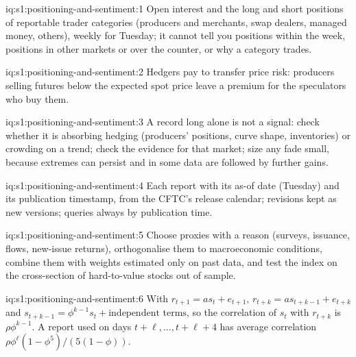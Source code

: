 \begin{solution}{iq:s1:positioning-and-sentiment:1}
Open interest and the long and short positions of reportable trader categories (producers and merchants, swap dealers, managed money, others), weekly
for Tuesday; it cannot tell you positions within the week, positions in other markets or over the counter, or why a category trades.
\end{solution}

\begin{solution}{iq:s1:positioning-and-sentiment:2}
Hedgers pay to transfer price risk: producers selling futures below the expected spot price leave a premium for the speculators who buy them.
\end{solution}

\begin{solution}{iq:s1:positioning-and-sentiment:3}
A record long alone is not a signal: check whether it is absorbing hedging (producers' positions, curve shape, inventories) or crowding on a trend;
check the evidence for that market; size any fade small, because extremes can persist and in some data are followed by further gains.
\end{solution}

\begin{solution}{iq:s1:positioning-and-sentiment:4}
Each report with its as-of date (Tuesday) and its publication timestamp, from the CFTC's release calendar; revisions kept as new versions; queries
always by publication time.
\end{solution}

\begin{solution}{iq:s1:positioning-and-sentiment:5}
Choose proxies with a reason (surveys, issuance, flows, new-issue returns), orthogonalise them to macroeconomic conditions, combine them with weights
estimated only on past data, and test the index on the cross-section of hard-to-value stocks out of sample.
\end{solution}

\begin{solution}{iq:s1:positioning-and-sentiment:6}
With $r_{t+1} = a s_t + e_{t+1}$, $r_{t+k} = a s_{t+k-1} + e_{t+k}$ and $s_{t+k-1} = \phi^{k-1}s_t + \text{independent terms}$, so the correlation of $s_t$
with $r_{t+k}$ is $\rho\phi^{k-1}$. A report used on days $t + \ell, \dots, t + \ell + 4$ has average correlation $\rho\phi^{\ell}(1 - \phi^5)/(5(1 - \phi))$.
\end{solution}

